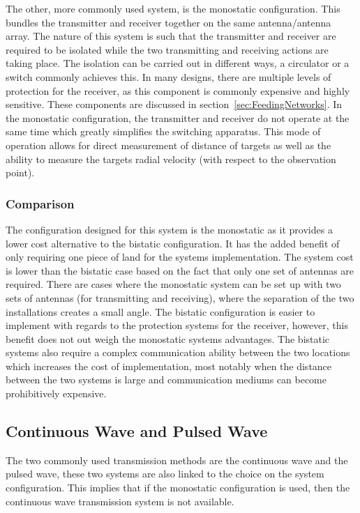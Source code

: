 \documentclass[11pt]{witseiepaper}
\begin{document}
\begin{bibunit}[witseie]
The other, more commonly used system, is the monostatic configuration. This bundles the transmitter and receiver together on the same antenna/antenna array. The nature of this system is such that the transmitter and receiver are required to be isolated while the two transmitting and receiving actions are taking place. The isolation can be carried out in different ways, a circulator or a switch commonly achieves this. In many designs, there are multiple levels of protection for the receiver, as this component is commonly expensive and highly sensitive. These components are discussed in section~\ref{sec:FeedingNetworks}. In the monostatic configuration, the transmitter and receiver do not operate at the same time which greatly simplifies the switching apparatus.
This mode of operation allows for direct measurement of distance of targets as well as the ability to measure the targets radial velocity (with respect to the observation point).

\subsubsection{Comparison} \label{sec:Comparison}
The configuration designed for this system is the monostatic as it provides a lower cost alternative to the bistatic configuration. It has the added benefit of only requiring one piece of land for the systems implementation. The system cost is lower than the bistatic case based on the fact that only one set of antennas are required. There are cases where the monostatic system can be set up with two sets of antennas (for transmitting and receiving), where the separation of the two installations creates a small angle.
The bistatic configuration is easier to implement with regards to the protection systems for the receiver, however, this benefit does not out weigh the monostatic systems advantages. The bistatic systems also require a complex communication ability between the two locations which increases the cost of implementation, most notably when the distance between the two systems is large and communication mediums can become prohibitively expensive.

\subsection{Continuous Wave and Pulsed Wave} \label{sec:ContinuousWaveandPulsedWave}

The two commonly used transmission methods are the continuous wave and the pulsed wave, these two systems are also linked to the choice on the system configuration.
This implies that if the monostatic configuration is used, then the continuous wave transmission system is not available.


\end{bibunit}
\end{document}
